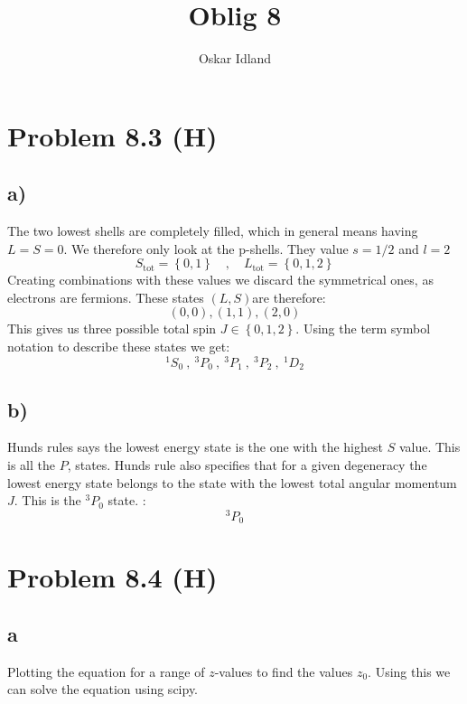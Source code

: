 \documentclass{article}
\author{Oskar Idland}
\title{Oblig 8}
\date{}
\begin{document}
\maketitle
\newpage





\section*{Problem 8.3 (H)}
\subsection*{a)}

The two lowest shells are completely filled, which in general means having $L = S = 0$. We therefore only look at the p-shells. They value $s = 1 / 2$ and $l = 2$
\[
S_{\text{tot}} = \left\{0,1\right\} \quad , \quad L_{\text{tot}} = \left\{0,1,2\right\}
\]
Creating combinations with these values we discard the symmetrical ones, as electrons are fermions. These states $(L,S)$are therefore:
\[
(0, 0), (1,1), (2,0)
\]
This gives us three possible total spin $J ∈ \left\{0,1,2\right\}$. 
Using the term symbol notation to describe these states we get:
\[
^1S_0 \ ,\ ^3P_0 \ ,\ ^3P_1 \ ,\  ^3P_2 \ ,\ ^1D_2 
\]

\subsection*{b)}
Hunds rules says the lowest energy state is the one with the highest $S$ value. This is all the $P$, states. Hunds rule also specifies that for a given degeneracy the lowest energy state belongs to the state with the lowest total angular momentum $J$. This is the $^3P_0$ state. : 
\[
^3P_0
\]


\newpage
\section*{Problem 8.4 (H)}
\subsection*{a}
Plotting the equation for a range of $z$-values to find the values $z_0$. Using this we can solve the equation using scipy. 
\end{document}

